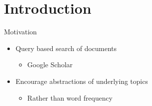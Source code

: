\section{Introduction}

\begin{frame}{\insertsection}{Motivation}
	\begin{itemize}
		\item Query based search of documents
		\begin{itemize}
			\item Google Scholar
		\end{itemize}
		\item Encourage abstractions of underlying topics
		\begin{itemize}
			\item Rather than word frequency
		\end{itemize}
	\end{itemize}
\end{frame}


